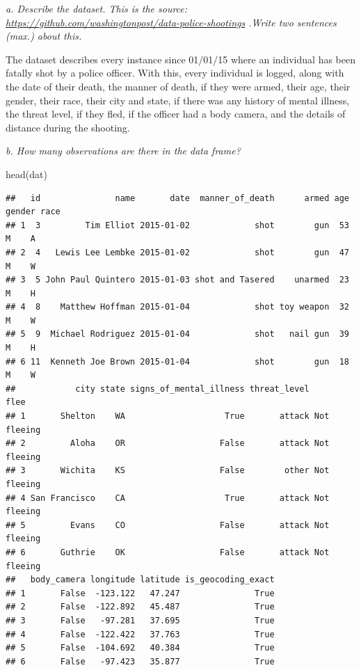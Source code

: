 \documentclass[
]{article}
\newenvironment{Shaded}{\begin{snugshade}}{\end{snugshade}}
\newcommand{\FunctionTok}[1]{\textcolor[rgb]{0.00,0.00,0.00}{#1}}
\newcommand{\NormalTok}[1]{#1}
\begin{document}
\emph{a. Describe the dataset. This is the source:}
\emph{\url{https://github.com/washingtonpost/data-police-shootings}
.Write two sentences (max.) about this.}

The dataset describes every instance since 01/01/15 where an individual
has been fatally shot by a police officer. With this, every individual
is logged, along with the date of their death, the manner of death, if
they were armed, their age, their gender, their race, their city and
state, if there was any history of mental illness, the threat level, if
they fled, if the officer had a body camera, and the details of distance
during the shooting.

\emph{b. How many observations are there in the data frame?}

\begin{Shaded}
\begin{Highlighting}[]
\FunctionTok{head}\NormalTok{(dat)}
\end{Highlighting}
\end{Shaded}

\begin{verbatim}
##   id               name       date  manner_of_death      armed age gender race
## 1  3         Tim Elliot 2015-01-02             shot        gun  53      M    A
## 2  4   Lewis Lee Lembke 2015-01-02             shot        gun  47      M    W
## 3  5 John Paul Quintero 2015-01-03 shot and Tasered    unarmed  23      M    H
## 4  8    Matthew Hoffman 2015-01-04             shot toy weapon  32      M    W
## 5  9  Michael Rodriguez 2015-01-04             shot   nail gun  39      M    H
## 6 11  Kenneth Joe Brown 2015-01-04             shot        gun  18      M    W
##            city state signs_of_mental_illness threat_level        flee
## 1       Shelton    WA                    True       attack Not fleeing
## 2         Aloha    OR                   False       attack Not fleeing
## 3       Wichita    KS                   False        other Not fleeing
## 4 San Francisco    CA                    True       attack Not fleeing
## 5         Evans    CO                   False       attack Not fleeing
## 6       Guthrie    OK                   False       attack Not fleeing
##   body_camera longitude latitude is_geocoding_exact
## 1       False  -123.122   47.247               True
## 2       False  -122.892   45.487               True
## 3       False   -97.281   37.695               True
## 4       False  -122.422   37.763               True
## 5       False  -104.692   40.384               True
## 6       False   -97.423   35.877               True
\end{verbatim}
\end{document}
